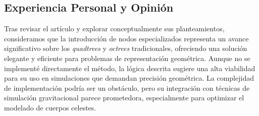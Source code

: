 \subsection{Experiencia Personal y Opinión}

Tras revisar el artículo y explorar conceptualmente sus planteamientos, consideramos que la introducción de nodos especializados representa un avance significativo sobre los \textit{quadtrees} y \textit{octrees} tradicionales, ofreciendo una solución elegante y eficiente para problemas de representación geométrica. Aunque no se implementé directamente el método, la lógica descrita sugiere una alta viabilidad para su uso en simulaciones que demandan precisión geométrica. La complejidad de implementación podría ser un obstáculo, pero su integración con técnicas de simulación gravitacional parece prometedora, especialmente para optimizar el modelado de cuerpos celestes.